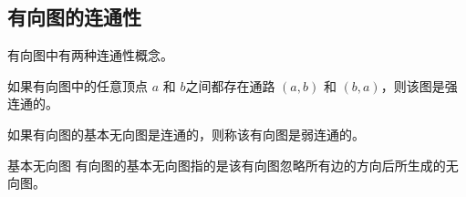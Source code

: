 \subsection{有向图的连通性}
有向图中有两种连通性概念。
\begin{definition}[有向图的强连通性]\label{def:有向图的强连通性}
    如果有向图中的任意顶点 $a$ 和 $b$之间都存在通路 $(a,b)$ 和 $(b,a)$，则该图是强连通的。
\end{definition}
\begin{definition}[有向图的弱连通性]\label{def:有向图的弱连通性}
    如果有向图的基本无向图是连通的，则称该有向图是弱连通的。
\end{definition}
\begin{info}{基本无向图}
    有向图的基本无向图指的是该有向图忽略所有边的方向后所生成的无向图。
\end{info}